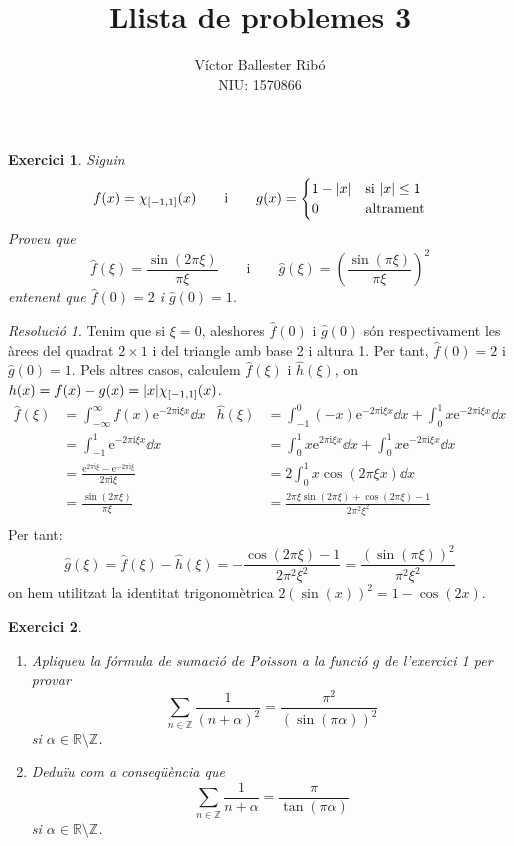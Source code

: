 \documentclass[10pt,a4paper]{article}
\title{\bfseries\Large Llista de problemes 3}
\author{Víctor Ballester Ribó\\NIU: 1570866}
\date{\parbox{\linewidth}{\centering
  Anàlisi Harmònica\endgraf
  Grau en Matemàtiques\endgraf
  Universitat Autònoma de Barcelona\endgraf
  Març de 2023}}
\newcommand{\ZZ}{\ensuremath{\mathbb{Z}}} %
\newcommand{\RR}{\ensuremath{\mathbb{R}}} %
\newcommand{\ii}{\mathrm{i}} %
\newtheorem{exercici}{Exercici}
\theoremstyle{definition}
\theoremstyle{remark}
\newtheorem*{res}{Resolució}
\renewcommand{\exp}[1]{\mathrm{e}^{#1}} %
\begin{document}
\maketitle
\begin{exercici}
  Siguin
  $$f(x)=\chi_{[-1,1]}(x)\qquad\text{i}\qquad g(x)=\begin{cases}
      1-\abs{x} & \text{si }\abs{x}\leq 1 \\
      0         & \text{altrament}
    \end{cases}$$
  Proveu que
  $$\widehat{f}(\xi)=\frac{\sin(2\pi\xi)}{\pi\xi}\qquad\text{i}\qquad\widehat{g}(\xi)={\left(\frac{\sin(\pi\xi)}{\pi\xi}\right)}^2$$
  entenent que $\widehat{f}(0)=2$ i $\widehat{g}(0)=1$.
\end{exercici}
\begin{res}
  Tenim que si $\xi=0$, aleshores $\widehat{f}(0)$ i $\widehat{g}(0)$ són respectivament les àrees del quadrat $2\times 1$ i del triangle amb base 2 i altura 1. Per tant, $\widehat{f}(0)=2$ i $\widehat{g}(0)=1$. Pels altres casos, calculem $\widehat{f}(\xi)$ i $\widehat{h}(\xi)$, on $h(x)=f(x)-g(x)=\abs{x}\chi_{[-1,1]}(x)$.
  \begin{align*}
    \widehat{f}(\xi) & =\int_{-\infty}^\infty f(x)\exp{-2\pi\ii\xi x}\dd{x}    & \widehat{h}(\xi) & =\int_{-1}^0 (-x)\exp{-2\pi\ii\xi x}\dd{x} +\int_{0}^1 x\exp{-2\pi\ii\xi x}\dd{x} \\
                     & =\int_{-1}^1\exp{-2\pi\ii\xi x}\dd{x}                   &                  & =\int_{0}^1 x\exp{2\pi\ii\xi x}\dd{x} +\int_{0}^1 x\exp{-2\pi\ii\xi x}\dd{x}      \\
                     & =\frac{\exp{2\pi\ii\xi}-\exp{-2\pi\ii\xi}}{2\pi\ii \xi} &                  & =2 \int_{0}^1 x\cos(2\pi\xi x)\dd{x}                                              \\
                     & =\frac{\sin(2\pi\xi)}{\pi\xi}                           &                  & =\frac{2\pi\xi\sin(2\pi\xi) + \cos(2\pi\xi) - 1}{2\pi^2\xi^2}                     \\
  \end{align*}
  Per tant: $$\widehat{g}(\xi)=\widehat{f}(\xi)-\widehat{h}(\xi)=-\frac{\cos(2\pi\xi) - 1}{2\pi^2\xi^2}=\frac{{(\sin(\pi\xi))}^2}{\pi^2\xi^2}$$
  on hem utilitzat la identitat trigonomètrica $2{(\sin(x))}^2=1-\cos(2x)$.
\end{res}
\begin{exercici}\hfill
  \begin{enumerate}
    \item Apliqueu la fórmula de sumació de Poisson a la funció $g$ de l'exercici 1 per provar
          $$\sum_{n\in\ZZ}\frac{1}{{(n+\alpha)}^2}=\frac{\pi^2}{{(\sin(\pi\alpha))}^2}$$
          si $\alpha\in\RR\setminus\ZZ$.
    \item Deduïu com a conseqüència que
          $$\sum_{n\in\ZZ}\frac{1}{n+\alpha}=\frac{\pi}{\tan(\pi\alpha)}$$
          si $\alpha\in\RR\setminus\ZZ$.
  \end{enumerate}
\end{exercici}
\end{document}
